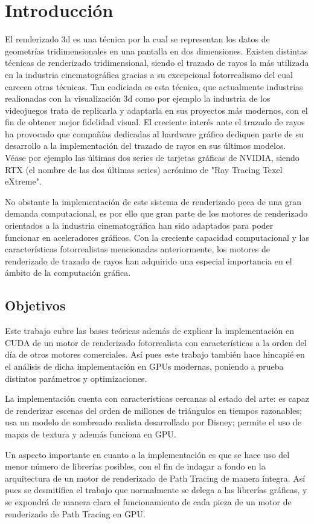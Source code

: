 \chapter{Introducción}
	
El renderizado 3d es una técnica por la cual se representan los datos de geometrías tridimensionales en una pantalla en dos dimensiones. Existen distintas técnicas de renderizado tridimensional, siendo el trazado de rayos la más utilizada en la industria cinematográfica gracias a su excepcional fotorrealismo del cual carecen otras técnicas. Tan codiciada es esta técnica, que actualmente industrias realionadas con la visualización 3d como por ejemplo la industria de los videojuegos trata de replicarla y adaptarla en sus proyectos más modernos, con el fin de obtener mejor fidelidad visual.
El creciente interés ante el trazado de rayos ha provocado que compañías dedicadas al hardware gráfico dediquen parte de su desarrollo a la implementación del trazado de rayos en sus últimos modelos. Véase por ejemplo las últimas dos series de tarjetas gráficas de NVIDIA, siendo RTX (el nombre de las dos últimas series) acrónimo de "Ray Tracing Texel eXtreme". 

No obstante la implementación de este sistema de renderizado peca de una gran demanda computacional, es por ello que gran parte de los motores de renderizado orientados a la industria cinematográfica han sido adaptados para poder funcionar en aceleradores gráficos. Con la creciente capacidad computacional y las características fotorrealistas mencionadas anteriormente, los motores de renderizado de trazado de rayos han adquirido una especial importancia en el ámbito de la computación gráfica.



\section{Objetivos}

Este trabajo cubre las bases teóricas además de explicar la implementación en CUDA de un motor de renderizado fotorrealista con características a la orden del día de otros motores comerciales. Así pues este trabajo también hace hincapié en el análisis de dicha implementación en GPUs modernas, poniendo a prueba distintos parámetros y optimizaciones.

La implementación cuenta con características cercanas al estado del arte: es capaz de renderizar escenas del orden de millones de triángulos en tiempos razonables; usa un modelo de sombreado realista desarrollado por Disney; permite el uso de mapas de textura y además funciona en GPU.

Un aspecto importante en cuanto a la implementación es que se hace uso del menor número de librerías posibles, con el fin de indagar a fondo en la arquitectura de un motor de renderizado de Path Tracing de manera íntegra. Así pues se desmitifica el trabajo que normalmente se delega a las librerías gráficas, y se expondrá de manera clara el funcionamiento de cada pieza de un motor de renderizado de Path Tracing en GPU.
